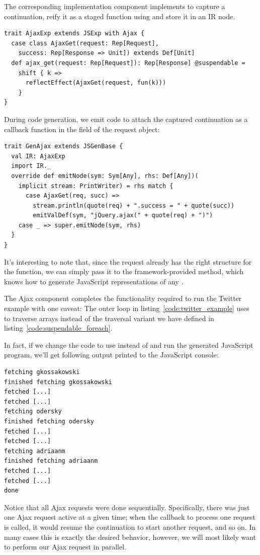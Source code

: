 \documentclass[runningheads,a4paper]{llncs}
\begin{document}
The corresponding implementation component implements  to capture a continuation, reify it as a staged function using  and store it in an  IR node. 
\begin{lstlisting}
trait AjaxExp extends JSExp with Ajax {
  case class AjaxGet(request: Rep[Request],
    success: Rep[Response => Unit]) extends Def[Unit]
  def ajax_get(request: Rep[Request]): Rep[Response] @suspendable = 
    shift { k =>
      reflectEffect(AjaxGet(request, fun(k)))
    }
}
\end{lstlisting}

During code generation, we emit code to attach the captured continuation as a callback function in the  field of the request object:
\begin{lstlisting}
trait GenAjax extends JSGenBase {
  val IR: AjaxExp
  import IR._
  override def emitNode(sym: Sym[Any], rhs: Def[Any])(
    implicit stream: PrintWriter) = rhs match {
      case AjaxGet(req, succ) => 
        stream.println(quote(req) + ".success = " + quote(succ)) 
        emitValDef(sym, "jQuery.ajax(" + quote(req) + ")")
    case _ => super.emitNode(sym, rhs)
  }
}
\end{lstlisting}

It's interesting to note that, since the request already has the right structure for the  function, we can simply pass it to the framework-provided  method, which knows how to generate JavaScript representations of any .

The Ajax component completes the functionality required to run the Twitter example with one caveat:
The outer loop in listing~\ref{code:twitter_example} uses  to traverse arrays instead of the  traversal variant we have defined in listing~\ref{code:suspendable_foreach}. 

In fact, if we change the code to use  instead of  and run the generated JavaScript program, we'll get following output printed to the JavaScript console:
\begin{lstlisting}
fetching gkossakowski
finished fetching gkossakowski
fetched [...]
fetched [...]
fetching odersky
finished fetching odersky
fetched [...]
fetched [...]
fetching adriaanm
finished fetching adriaanm
fetched [...]
fetched [...]
done
\end{lstlisting}

Notice that all Ajax requests were done sequentially. Specifically,
there was just one Ajax request active at a given time; when the
callback to process one request is called, it would resume the
continuation to start another request, and so on. In many cases this
is exactly the desired behavior, however, we will most likely
want to perform our Ajax request in parallel.
\end{document}
